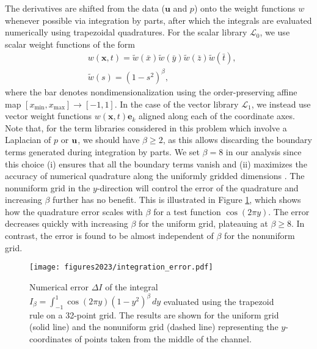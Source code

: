 \documentclass[preprint]{article}
\def\bi#1{\textbf{#1}}
\begin{document}
The derivatives are shifted from the data (${\bi u}$ and $p$) onto the weight functions $w$ whenever possible via integration by parts, after which the integrals are evaluated numerically using trapezoidal quadratures. 
For the scalar library $\mathcal{L}_0$, we use scalar weight functions of the form
\begin{align} \label{eq:wf}
&w({\bi x},t) = \tilde{w}(\bar{x})\tilde{w}(\bar{y})\tilde{w}(\bar{z})\tilde{w}(\bar{t}), \nonumber\\
&\tilde{w}(s) = (1-s^2)^\beta,
\end{align}
where the bar denotes nondimensionalization using the order-preserving affine map $[x_{\textrm{min}},x_{\textrm{max}}] \to [-1,1]$. 
In the case of the vector library $\mathcal{L}_1$, we instead use vector weight functions $w({\bi x}, t){\bi e}_k$ aligned along each of the coordinate axes.
Note that, for the term libraries considered in this problem which involve a Laplacian of $p$ or ${\bf u}$, we should have $\beta\ge 2$, as this allows discarding the boundary terms generated during integration by parts. We set $\beta = 8$ in our analysis since this choice (i) ensures that all the boundary terms vanish and (ii) maximizes the accuracy of numerical quadrature along the uniformly gridded dimensions \citep{gurevich2019}. The nonuniform grid in the $y$-direction will control the error of the quadrature and increasing $\beta$ further has no benefit. This is illustrated in Figure \ref{fig:integration_error}, which shows how the quadrature error scales with $\beta$ for a test function $\cos(2\pi y)$. %
The error decreases quickly with increasing $\beta$ for the uniform grid, plateauing at $\beta\ge 8$. In contrast, the error is found to be almost independent of $\beta$ for the nonuniform grid.

\begin{figure}[h]
    \centering
    \texttt{[image: figures2023/integration\_error.pdf]}
    
    \caption{
    Numerical error $\Delta I$ of the integral $I_\beta = \int_{-1}^1 \cos(2\pi y) (1-y^2)^\beta \, dy$ evaluated using the trapezoid rule on a 32-point grid. The results are shown for the uniform grid (solid line) and the nonuniform grid (dashed line) representing the $y$-coordinates of points taken from the middle of the channel. %
    }
    \label{fig:integration_error}
\end{figure}
\end{document}
